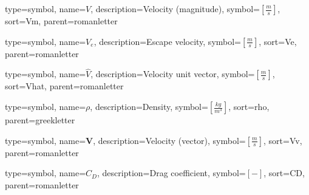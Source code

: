 {
type=symbol, %
name={\ensuremath{V}}, %
description={Velocity (magnitude)}, %
symbol={$\left[\frac{m}{s}\right]$}, %
sort=Vm, %
parent=romanletter %
}

{
type=symbol, %
name={\ensuremath{V_e}}, %
description={Escape velocity}, %
symbol={$\left[\frac{m}{s}\right]$}, %
sort=Ve, %
parent=romanletter %
}

{
	type=symbol, %
	name={\ensuremath{\hat{V}}}, %
	description={Velocity unit vector}, %
	symbol={$\left[\frac{m}{s}\right]$}, %
	sort=Vhat, %
	parent=romanletter %
}

{
type=symbol, %
name={\ensuremath{\rho}}, %
description={Density}, %
symbol={$\left[\frac{kg}{m^3}\right]$}, %
sort=rho, %
parent=greekletter %
}

{
type=symbol, %
name={\ensuremath{\mathbf{V}}}, %
description={Velocity (vector)}, %
symbol={$\left[\frac{m}{s}\right]$}, %
sort=Vv, %
parent=romanletter %
}

{
type=symbol, %
name={\ensuremath{C_D}}, %
description={Drag coefficient}, %
symbol={$\left[-\right]$}, %
sort=CD, %
parent=romanletter %
}

